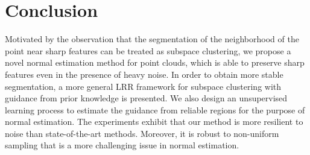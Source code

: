 \section{Conclusion}
Motivated by the observation that the segmentation of the neighborhood of the point near sharp features can be treated as subspace clustering, we propose a novel normal estimation method for point clouds, which is able to preserve sharp features even in the presence of heavy noise.
%
In order to obtain more stable segmentation, a more general LRR framework for subspace clustering with guidance from prior knowledge is presented. We also design an unsupervised learning process to estimate the guidance from reliable regions for the purpose of normal estimation.
%
The experiments exhibit that our method is more resilient to noise than state-of-the-art methods.
%
Moreover, it is robust to non-uniform sampling that is a more challenging issue in normal estimation.
%


%

